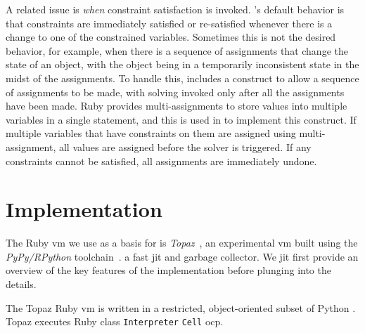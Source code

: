 A related issue is \emph{when} constraint satisfaction is invoked.
\langname's default behavior is that constraints are immediately
satisfied or re-satisfied whenever there is a change to one of the
constrained variables.  Sometimes this is not the desired behavior,
for example, when there is a sequence of assignments that change the
state of an object, with the object being in a temporarily
inconsistent state in the midst of the assignments.  To handle this,
\langname includes a construct to allow a sequence of assignments to
be made, with solving invoked only after all the assignments have been
made.  Ruby provides multi-assignments to store values into multiple
variables in a single statement, and this is used in \toolname to
implement this construct.  If multiple variables that have constraints
on them are assigned using multi-assignment, all values are assigned
before the solver is triggered. If any constraints cannot be
satisfied, all assignments are immediately undone\DIFaddbegin {}\DIFaddend .

\section{Implementation}
\label{sec:implementation}
The Ruby \ac{vm} we use as a basis for \toolname is
\emph{Topaz}~\cite{FelgentreffTopazWroclove2013}, an experimental
\ac{vm} built using the \emph{PyPy/RPython}
toolchain~\cite{rigo2006pypy}. \DIFdelbegin {}%
\DIFdelend \DIFaddbegin {}\DIFaddend a fast \ac{jit} \DIFaddbegin {}\DIFaddend and
garbage collector. We \DIFaddbegin {}\ac{jit} \DIFaddend first
provide an overview of the key features of the implementation before
plunging into the details.

The Topaz Ruby \ac{vm} is written in \DIFdelbegin {}\DIFdelend a restricted, object-oriented
subset of Python \DIFaddbegin {}\DIFaddend . Topaz executes Ruby \DIFdelbegin {}\DIFdelend \DIFaddbegin {}\DIFaddend class \lstinline{Interpreter}\DIFdelbegin {}%
\DIFdelend \DIFaddbegin {}\lstinline{Cell} \toolname{}\ac{ocp}\DIFaddend .

